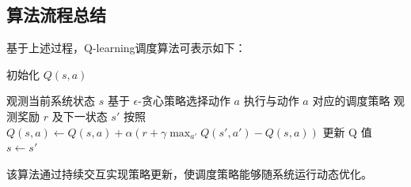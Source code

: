 \subsection{算法流程总结}

基于上述过程，Q-learning调度算法可表示如下：

\begin{algorithm}[htbp]
\caption{基于Q-learning的调度算法}
\begin{algorithmic}[1]

\State 初始化 $Q(s,a)$

    \State 观测当前系统状态 $s$
    \State 基于 $\epsilon$-贪心策略选择动作 $a$
    \State 执行与动作 $a$ 对应的调度策略
    \State 观测奖励 $r$ 及下一状态 $s'$
    \State 按照
    $Q(s,a) \leftarrow Q(s,a) + \alpha \left( r + \gamma \max_{a'} Q(s',a') - Q(s,a) \right)$
    更新 Q 值
    \State $s \gets s'$
\EndWhile

\end{algorithmic}
\end{algorithm}

该算法通过持续交互实现策略更新，使调度策略能够随系统运行动态优化。
